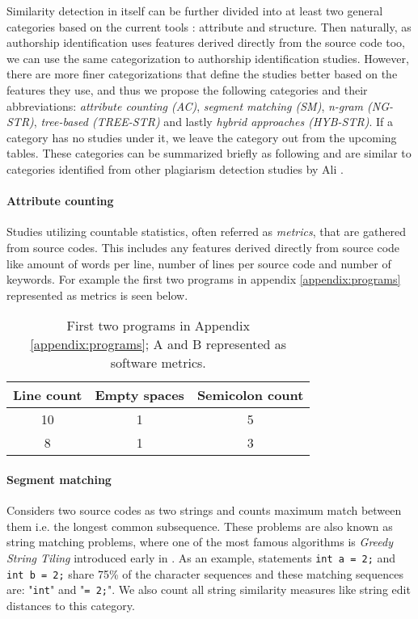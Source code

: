Similarity detection in itself can be further divided into at least two general categories based on the current tools \cite{RSCAD2016}: attribute and structure. Then naturally, as authorship identification uses features derived directly from the source code too, we can use the same categorization to authorship identification studies. However, there are more finer categorizations that define the studies better based on the features they use, and thus we propose the following categories and their abbreviations: \emph{attribute counting (AC)}, \emph{segment matching (SM)}, \emph{n-gram (NG-STR)}, \emph{tree-based (TREE-STR)} and lastly \emph{hybrid approaches (HYB-STR)}. If a category has no studies under it, we leave the category out from the upcoming tables. These categories can be summarized briefly as following and are similar to categories identified from other plagiarism detection studies by Ali \etal \cite{OCPOCP2011}. 

\paragraph{Attribute counting}
Studies utilizing countable statistics, often referred as \emph{metrics}, that are gathered from source codes. This includes any features derived directly from source code like amount of words per line, number of lines per source code and number of keywords. For example the first two programs in appendix \ref{appendix:programs} represented as metrics is seen below.

\begin{table}[ht]
    \centering
    \begin{tabular}{|c|c|c|} \hline
        \textbf{Line count} & \textbf{Empty spaces} & \textbf{Semicolon count}\\ \hline
         10 & 1 & 5 \\ \hline
         8 & 1 & 3\\ \hline
    \end{tabular}
    \caption{First two programs in Appendix \ref{appendix:programs}; A and B represented as software metrics.}
    \label{tab:my_label}
\end{table}

\paragraph{Segment matching}
Considers two source codes as two strings and counts maximum match between them i.e. the longest common subsequence. These problems are also known as string matching problems, where one of the most famous algorithms is \emph{Greedy String Tiling} introduced early in \cite{SSGST1993}. As an example, statements \texttt{int a = 2;} and \texttt{int b = 2;} share 75\% of the character sequences and these matching sequences are: "\texttt{int}" and "\texttt{= 2;}". We also count all string similarity measures like string edit distances  to this category.

